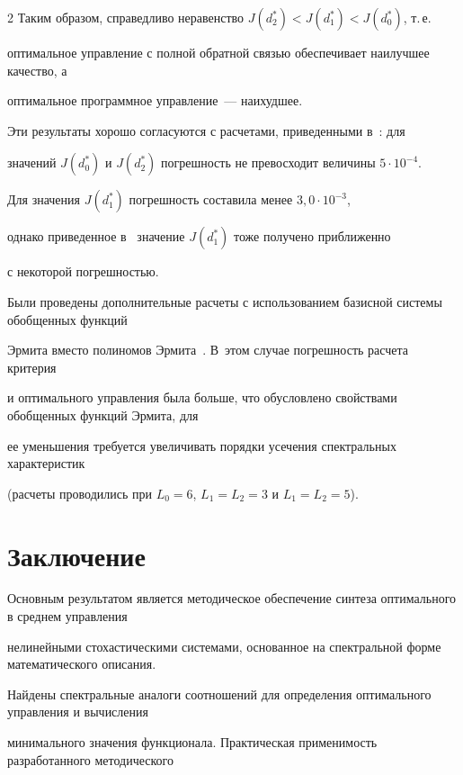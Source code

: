 \begin{multicols}{2}
Таким образом, справедливо неравенство ${J(d^*_2) < J(d^*_1) < J(d^*_0)}$, т.\,е.\ 


оптимальное управление с полной обратной связью обеспечивает наилучшее качество, а 


оптимальное программное управ\-ле\-ние~--- наихудшее.





Эти результаты хорошо согласуются с расчетами, приведенными в~\cite{Pan_Synt}: для 


значений $J(d^*_0)$ и $J(d^*_2)$ погрешность не превосходит величины $5 \cdot 10^{-4}$. 


Для значения $J(d^*_1)$ погрешность составила менее $3{,}0 \cdot 10^{-3}$, 


однако приведенное в~\cite{Pan_Synt} значение $J(d^*_1)$ тоже получено приближенно 


с некоторой погрешностью.





Были проведены дополнительные расчеты с использованием базисной сис\-те\-мы обобщенных функций 


Эрмита вместо полиномов Эрмита~\cite{RomRyb}. В~этом случае погрешность расчета критерия 


и оптимального управления была больше, что обу\-слов\-ле\-но свойствами обобщенных функций Эрмита, для 


ее уменьшения требуется увеличивать порядки усечения спектральных характеристик 


(расчеты проводились при ${L_0 = 6}$, ${L_1 = L_2 = 3}$ и ${L_1 = L_2 = 5}$).





\section{Заключение}





Основным результатом является методическое обеспечение синтеза оптимального в среднем управ\-ле\-ния 


нелинейными стохастическими сис\-те\-мами, основанное на спектральной форме математического описания. 


Найдены спектральные аналоги соотношений для определения оптимального управления и вычисления 


минимального значения функционала. Практическая применимость разработанного методического 



\end{multicols}

